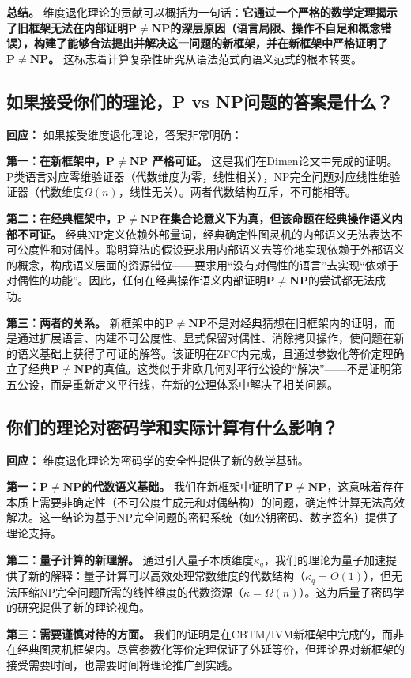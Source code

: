 \documentclass{ctexart}
\begin{document}
	\textbf{总结。} 维度退化理论的贡献可以概括为一句话：\textbf{它通过一个严格的数学定理揭示了旧框架无法在内部证明$\mathbf{P}\neq\mathbf{NP}$的深层原因（语言局限、操作不自足和概念错误），构建了能够合法提出并解决这一问题的新框架，并在新框架中严格证明了$\mathbf{P} \neq \mathbf{NP}$。} 这标志着计算复杂性研究从语法范式向语义范式的根本转变。
	
	
	\subsection{如果接受你们的理论，P vs NP问题的答案是什么？}
	
	\textbf{回应：} 如果接受维度退化理论，答案非常明确：
	
	\textbf{第一：在新框架中，$\mathbf{P} \neq \mathbf{NP}$ 严格可证。} 这是我们在Dimen论文中完成的证明。P类语言对应零维验证器（代数维度为零，线性相关），NP完全问题对应线性维验证器（代数维度$\Omega(n)$，线性无关）。两者代数结构互斥，不可能相等。
	
	\textbf{第二：在经典框架中，$\mathbf{P}\neq\mathbf{NP}$在集合论意义下为真，但该命题在经典操作语义内部不可证。} 经典NP定义依赖外部量词，经典确定性图灵机的内部语义无法表达不可公度性和对偶性。聪明算法的假设要求用内部语义去等价地实现依赖于外部语义的概念，构成语义层面的资源错位——要求用``没有对偶性的语言''去实现``依赖于对偶性的功能''。因此，任何在经典操作语义内部证明$\mathbf{P}\neq\mathbf{NP}$的尝试都无法成功。
	
	\textbf{第三：两者的关系。} 新框架中的$\mathbf{P}\neq\mathbf{NP}$不是对经典猜想在旧框架内的证明，而是通过扩展语言、内建不可公度性、显式保留对偶性、消除拷贝操作，使问题在新的语义基础上获得了可证的解答。该证明在ZFC内完成，且通过参数化等价定理确立了经典$\mathbf{P}\neq\mathbf{NP}$的真值。这类似于非欧几何对平行公设的``解决''——不是证明第五公设，而是重新定义平行线，在新的公理体系中解决了相关问题。
	
	
	\subsection{你们的理论对密码学和实际计算有什么影响？}
	
	\textbf{回应：} 维度退化理论为密码学的安全性提供了新的数学基础。
	
	\textbf{第一：$\mathbf{P}\neq\mathbf{NP}$的代数语义基础。} 我们在新框架中证明了$\mathbf{P}\neq\mathbf{NP}$，这意味着存在本质上需要非确定性（不可公度生成元和对偶结构）的问题，确定性计算无法高效解决。这一结论为基于NP完全问题的密码系统（如公钥密码、数字签名）提供了理论支持。
	
	\textbf{第二：量子计算的新理解。} 通过引入量子本质维度$\kappa_q$，我们的理论为量子加速提供了新的解释：量子计算可以高效处理常数维度的代数结构（$\kappa_q = O(1)$），但无法压缩NP完全问题所需的线性维度的代数资源（$\kappa = \Omega(n)$）。这为后量子密码学的研究提供了新的理论视角。
	
	\textbf{第三：需要谨慎对待的方面。} 我们的证明是在CBTM/IVM新框架中完成的，而非在经典图灵机框架内。尽管参数化等价定理保证了外延等价，但理论界对新框架的接受需要时间，也需要时间将理论推广到实践。
	
	
	
	
\end{document}
